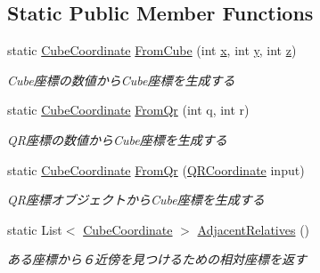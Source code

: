 \subsection*{Static Public Member Functions}
\begin{DoxyCompactItemize}
\item 
static \mbox{\hyperlink{struct_hexagonal_map_1_1_domain_1_1_hex_map_1_1_cube_coordinate}{Cube\+Coordinate}} \mbox{\hyperlink{struct_hexagonal_map_1_1_domain_1_1_hex_map_1_1_cube_coordinate_a9ec1879ec7ea7ca680a5d307878f34de}{From\+Cube}} (int \mbox{\hyperlink{struct_hexagonal_map_1_1_domain_1_1_hex_map_1_1_cube_coordinate_a4a7206575c3354e7eba699cef5811329}{x}}, int \mbox{\hyperlink{struct_hexagonal_map_1_1_domain_1_1_hex_map_1_1_cube_coordinate_a7a85b59a781b6bc6a1e028db63fb94b0}{y}}, int \mbox{\hyperlink{struct_hexagonal_map_1_1_domain_1_1_hex_map_1_1_cube_coordinate_a34cecd0b18328917cf707fb108cf18bb}{z}})
\begin{DoxyCompactList}\small\item\em Cube座標の数値から\+Cube座標を生成する \end{DoxyCompactList}\item 
static \mbox{\hyperlink{struct_hexagonal_map_1_1_domain_1_1_hex_map_1_1_cube_coordinate}{Cube\+Coordinate}} \mbox{\hyperlink{struct_hexagonal_map_1_1_domain_1_1_hex_map_1_1_cube_coordinate_ad6ed280d4164bdf8957c736958be1202}{From\+Qr}} (int q, int r)
\begin{DoxyCompactList}\small\item\em Q\+R座標の数値から\+Cube座標を生成する \end{DoxyCompactList}\item 
static \mbox{\hyperlink{struct_hexagonal_map_1_1_domain_1_1_hex_map_1_1_cube_coordinate}{Cube\+Coordinate}} \mbox{\hyperlink{struct_hexagonal_map_1_1_domain_1_1_hex_map_1_1_cube_coordinate_adf766c3cbbf7b2d382c0fc46ee450283}{From\+Qr}} (\mbox{\hyperlink{struct_hexagonal_map_1_1_domain_1_1_hex_map_1_1_q_r_coordinate}{Q\+R\+Coordinate}} input)
\begin{DoxyCompactList}\small\item\em Q\+R座標オブジェクトから\+Cube座標を生成する \end{DoxyCompactList}\item 
static List$<$ \mbox{\hyperlink{struct_hexagonal_map_1_1_domain_1_1_hex_map_1_1_cube_coordinate}{Cube\+Coordinate}} $>$ \mbox{\hyperlink{struct_hexagonal_map_1_1_domain_1_1_hex_map_1_1_cube_coordinate_a551d26721b23522e409dbab04d35b2d6}{Adjacent\+Relatives}} ()
\begin{DoxyCompactList}\small\item\em ある座標から６近傍を見つけるための相対座標を返す \end{DoxyCompactList}\item 

\end{DoxyCompactItemize}
